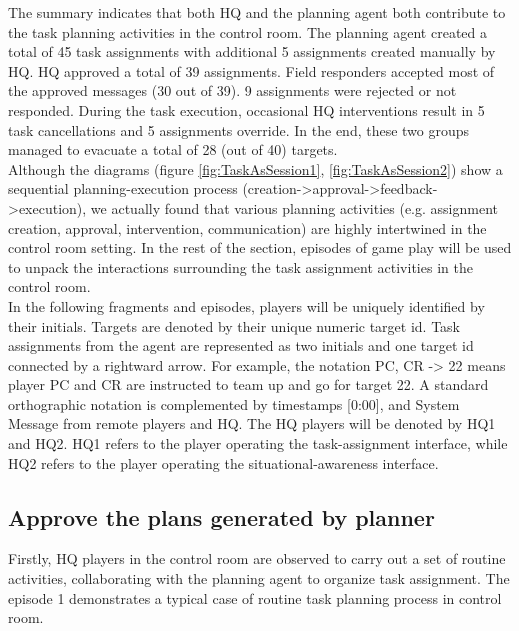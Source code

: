 The summary indicates that both HQ and the planning agent both contribute to the task planning activities in the control room. The planning agent created a total of 45 task assignments with additional 5 assignments created manually by HQ. HQ approved a total of 39 assignments. Field responders accepted most of the approved messages (30 out of 39). 9 assignments were rejected or not responded. During the task execution, occasional HQ interventions result in 5 task cancellations and 5 assignments override. In the end, these two groups managed to evacuate a total of 28 (out of 40) targets.\\ 

Although the diagrams (figure \ref{fig:TaskAsSession1}, \ref{fig:TaskAsSession2}) show a sequential planning-execution process (creation->approval->feedback->execution), we actually found that various planning activities (e.g. assignment creation, approval, intervention, communication) are highly intertwined in the control room setting. In the rest of the section, episodes of game play will be used to unpack the interactions surrounding the task assignment activities in the control room.\\

In the following fragments and episodes, players will be uniquely identified by their initials. Targets are denoted by their unique numeric target id. Task assignments from the agent are represented as two initials and one target id connected by a rightward arrow. For example, the notation PC, CR -> 22 means player PC and CR are instructed to team up and go for target 22. A standard orthographic notation is complemented by timestamps [0:00], and System Message from remote players and HQ. The HQ players will be denoted by HQ1 and HQ2. HQ1 refers to the player operating the task-assignment interface, while HQ2 refers to the player operating the situational-awareness interface.\\

\subsection{Approve the plans generated by planner}
Firstly, HQ players in the control room are observed to carry out a set of routine activities, collaborating with the planning agent to organize task assignment. The episode 1 demonstrates a typical case of routine task planning process in control room. \\

